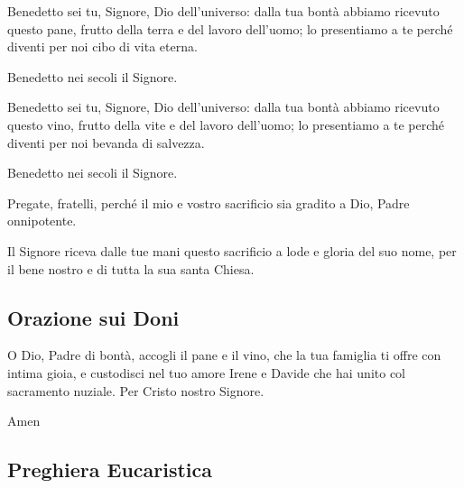 	\begin{dialoghi}
		\item[\sacerdote] Benedetto sei tu, Signore, Dio dell'universo: dalla tua bontà abbiamo ricevuto questo pane, frutto della terra e del lavoro dell'uomo; lo presentiamo a te perché diventi per noi cibo di vita eterna.
		\item[\assemblea] Benedetto nei secoli il Signore.
		\item[\sacerdote] Benedetto sei tu, Signore, Dio dell'universo: dalla tua bontà abbiamo ricevuto questo vino, frutto della vite e del lavoro dell'uomo; lo presentiamo a te perché diventi per noi bevanda di salvezza.
		\item[\assemblea] Benedetto nei secoli il Signore.
		\item[\sacerdote] Pregate, fratelli, perché il mio e vostro sacrificio sia gradito a Dio, Padre onnipotente.
		\item[\assemblea] Il Signore riceva dalle tue mani questo sacrificio a lode e gloria del suo nome, per il bene nostro e di tutta la sua santa Chiesa.
	\end{dialoghi}

\subsection*{Orazione sui Doni}

	\begin{dialoghi}
		\item[\sacerdote] O Dio, Padre di bontà, accogli il pane e il vino, che la tua famiglia ti offre con intima gioia, e custodisci nel tuo amore Irene e Davide che hai unito col sacramento nuziale. Per Cristo nostro Signore.
		\item[\assemblea] Amen
	\end{dialoghi}

\subsection*{Preghiera Eucaristica}

